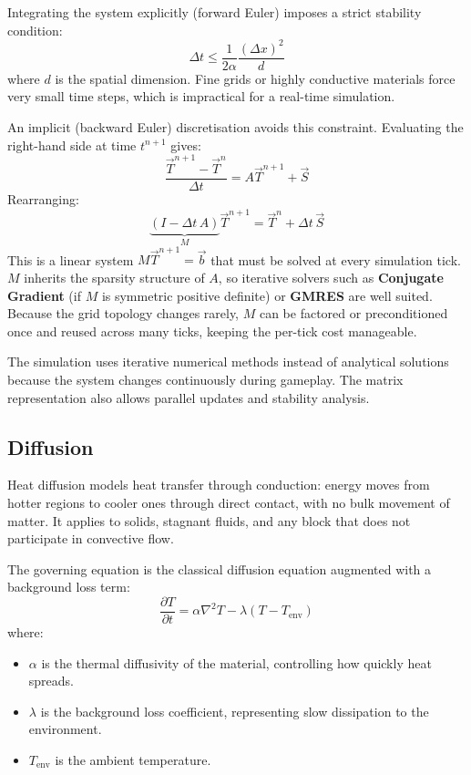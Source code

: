 \documentclass{report}
\begin{document}
Integrating the system explicitly (forward Euler) imposes a strict stability condition:
\[
\Delta t \leq \frac{1}{2\alpha} \frac{(\Delta x)^2}{d}
\]
where $d$ is the spatial dimension. Fine grids or highly conductive materials force very
small time steps, which is impractical for a real-time simulation.

An implicit (backward Euler) discretisation avoids this constraint. Evaluating the right-hand
side at time $t^{n+1}$ gives:
\[
\frac{\vec{T}^{n+1} - \vec{T}^{n}}{\Delta t} = A\vec{T}^{n+1} + \vec{S}
\]
Rearranging:
\[
\underbrace{(I - \Delta t\, A)}_{M} \vec{T}^{n+1} = \vec{T}^{n} + \Delta t\,\vec{S}
\]
This is a linear system $M\vec{T}^{n+1} = \vec{b}$ that must be solved at every simulation
tick. $M$ inherits the sparsity structure of $A$, so iterative solvers such as
\textbf{Conjugate Gradient} (if $M$ is symmetric positive definite) or \textbf{GMRES} are
well suited. Because the grid topology changes rarely, $M$ can be factored or preconditioned
once and reused across many ticks, keeping the per-tick cost manageable.

The simulation uses iterative numerical methods instead of analytical solutions because
the system changes continuously during gameplay.
The matrix representation also allows parallel updates and stability analysis.

\subsection{Diffusion}

Heat diffusion models heat transfer through conduction: energy moves from hotter regions to
cooler ones through direct contact, with no bulk movement of matter. It applies to solids,
stagnant fluids, and any block that does not participate in convective flow.

The governing equation is the classical diffusion equation augmented with a background loss term:
\[
\frac{\partial T}{\partial t} = \alpha \nabla^2 T - \lambda(T - T_{\text{env}})
\]
where:
\begin{itemize}
    \item $\alpha$ is the thermal diffusivity of the material, controlling how quickly heat spreads.
    \item $\lambda$ is the background loss coefficient, representing slow dissipation to the environment.
    \item $T_{\text{env}}$ is the ambient temperature.
\end{itemize}
\end{document}
